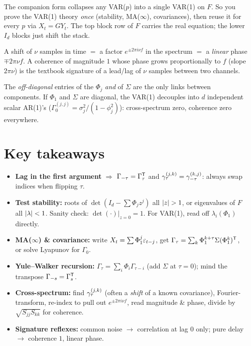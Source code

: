 \documentclass[11pt]{article}
\begin{document}
\begin{intu}
The companion form collapses any VAR($p$) into a single VAR(1) on $F$. So you prove the VAR(1) theory \emph{once} (stability, MA($\infty$), covariances), then reuse it for every $p$ via $X_t=GY_t$. The top block row of $F$ carries the real equation; the lower $I_d$ blocks just shift the stack.
\end{intu}

\begin{intu}
A shift of $\nu$ samples in time $=$ a factor $e^{\pm2\pi i\nu f}$ in the spectrum $=$ a \emph{linear} phase $\mp2\pi\nu f$. A coherence of magnitude $1$ whose phase grows proportionally to $f$ (slope $2\pi\nu$) is the textbook signature of a lead/lag of $\nu$ samples between two channels.
\end{intu}

\begin{intu}
The \emph{off-diagonal} entries of the $\Phi_j$ \emph{and} of $\Sigma$ are the only links between components. If $\Phi_1$ and $\Sigma$ are diagonal, the VAR(1) decouples into $d$ independent scalar AR(1)'s ($\Gamma_0^{(j,j)}=\sigma_j^2/(1-\phi_j^2)$): cross-spectrum zero, coherence zero everywhere.
\end{intu}

\section*{Key takeaways}

\begin{retenir}
\begin{itemize}
  \item \textbf{Lag in the first argument} $\Rightarrow$ $\Gamma_{-\tau}=\Gamma_\tau^{\mathsf{T}}$ and $\gamma_\tau^{(j,k)}=\gamma_{-\tau}^{(k,j)}$: always swap indices when flipping $\tau$.
  \item \textbf{Test stability:} roots of $\det(I_d-\sum\Phi_j z^j)$ all $\left\lvert z \right\rvert>1$, or eigenvalues of $F$ all $\left\lvert \lambda \right\rvert<1$. Sanity check: $\det(\cdot)\big|_{z=0}=1$. For VAR(1), read off $\lambda_i(\Phi_1)$ directly.
  \item \textbf{MA($\infty$) \& covariance:} write $X_t=\sum\Phi_1^j\varepsilon_{t-j}$, get $\Gamma_\tau=\sum_k\Phi_1^{k+\tau}\Sigma(\Phi_1^k)^{\mathsf{T}}$, or solve Lyapunov for $\Gamma_0$.
  \item \textbf{Yule--Walker recursion:} $\Gamma_\tau=\sum_i\Phi_i\Gamma_{\tau-i}$ (add $\Sigma$ at $\tau=0$); mind the transpose $\Gamma_{-s}=\Gamma_s^{\mathsf{T}}$.
  \item \textbf{Cross-spectrum:} find $\gamma_\tau^{(j,k)}$ (often a \emph{shift} of a known covariance), Fourier-transform, re-index to pull out $e^{\pm2\pi i\nu f}$, read magnitude \& phase, divide by $\sqrt{S_{jj}S_{kk}}$ for coherence.
  \item \textbf{Signature reflexes:} common noise $\to$ correlation at lag $0$ only; pure delay $\to$ coherence $1$, linear phase.
\end{itemize}
\end{retenir}
\end{document}
